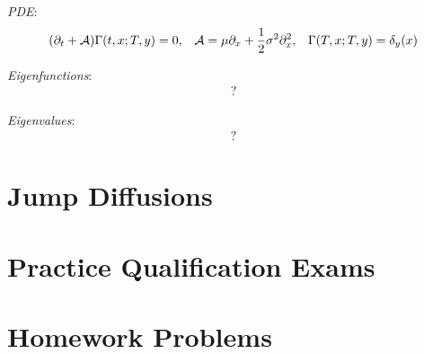 \documentclass[12pt]{article}
\begin{document}
\textit{PDE}:
\begin{align*}
    (\partial_t + \mathcal{A}) \Gamma(t,x;T,y) = 0,&& \mathcal{A} = \mu \partial_x + \frac{1}{2}\sigma^2 \partial_x^2 ,&& \Gamma(T,x;T,y) = \delta_y(x)
\end{align*}

\textit{Eigenfunctions}:
\begin{align*}
    ?
\end{align*}

\textit{Eigenvalues}:
\begin{align*}
    ?
\end{align*}




\pagebreak
\section{Jump Diffusions}



\pagebreak
\section{Practice Qualification Exams}


\pagebreak
\section{Homework Problems}








\end{document}
